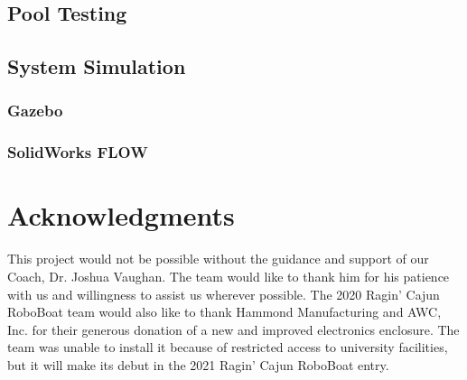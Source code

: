 \documentclass[letterpaper, 10 pt, conference]{ieeeconf}
\begin{document}
\subsection{Pool Testing}
\subsection{System Simulation}
\subsubsection{Gazebo}
\subsubsection{SolidWorks FLOW}
\section{Acknowledgments}
This project would not be possible without the guidance and support of our Coach, Dr. Joshua Vaughan. The team would like to thank him for his patience with us and willingness to assist us wherever possible. The 2020 Ragin' Cajun RoboBoat team would also like to thank Hammond Manufacturing and AWC, Inc. for their generous donation of a new and improved electronics enclosure. The team was unable to install it because of restricted access to university facilities, but it will make its debut in the 2021 Ragin' Cajun RoboBoat entry.
\newpage
\onecolumn
\end{document}
